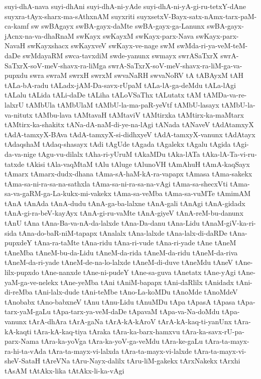 {suyi-dhA-nava
suyi-dhAni
suyi-dhA-ni-yAde
suyi-dhA-ni-yA-gi-ru-tetxY-dAne
suyxra-tAyx-sharx-ma-sAthxnAM
suyxriti
suyxsetxV-Bayx-satx-nAmx-tarx-paM-ca-kamf
sw
swBAgayx
swBA-gayx-daMte
swBA-gayx-ga-Lanunx
swBA-gayx-jAcnx-na-va-dhaRnaM
swKayx
swKayxM
swKayx-parx-Nava
swKayx-parx-NavaH
swKayxshacx
swKayxveV
swKayx-ve-nage
swM
swMda-ri-ya-veM-teM-daDe
swMdayaRM
swca-tavxdiM
swde-yanunx
swmayx
swrASaTxrX
swrA-SaTxrX-soV-meV-shavx-ra-liMga
swrA-SaTxrX-soV-meV-shavx-ra-liM-ga-va-pupxdu
swra
swraM
swrxH
swrxM
swvaNaRH
swvaNoRV
tA
tABAyxM
tAH
tALa-bA-radu
tALadx-jAM-Da-savx-rUpaM
tALa-lA-ga-deMdu
tALa-lAgi
tALalu
tALida
tALi-daDe
tALiha
tALoVSaThx
tALutatx
tAM
tAMDa-va-re-lalxrU
tAMbUla
tAMbUlaM
tAMbU-la-ma-paR-yeVtf
tAMbU-lasayx
tAMbU-la-va-nitutx
tAMbu-lava
tAMtavaH
tAMtaviV
tAMtirxka
tAMtirx-ka-maMtarx
tAMtirx-ka-shakitx
tANa-dA-naM-di-ye-na-lAgi
tANada
tANaveV
tAdAtamxyX
tAdA-tamxyX-BAva
tAdA-tamxyX-si-didhxyeV
tAdA-tamxyX-vanunx
tAdAtayx
tAdaqshaM
tAdaq-shasayx
tAdi
tAgUde
tAgada
tAgalekx
tAgalu
tAgida
tAgi-da-va-nige
tAgu-vu-dilalx
tAha-ri-yUruM
tAkaMDu
tAka-lATa
tAka-lA-Ta-vi-ru-tatxde
tAkisi
tAla-vaqMtaM
tAlu
tAluge
tAlunoVH
tAmAhuH
tAmA-kaqSayx
tAmarx
tAmarx-dudx-dhana
tAma-sA-haM-kA-ra-vapapx
tAmasa
tAma-sakekx
tAma-sa-ni-ra-sa-na-sathxla
tAma-sa-ni-ra-sa-na-vAgi
tAma-sa-shecxVti
tAma-sa-va-gaRM-ga-La-kukx-mi-vakekx
tAma-sa-veMba
tAma-sa-vuMTe
tAmimAM
tAnA
tAnAda
tAnA-dudu
tAnA-ga-ba-lalxne
tAnA-gali
tAnAgi
tAnA-gidadx
tAnA-gi-ra-beV-kayAyx
tAnA-gi-ru-vaMte
tAnA-giyeV
tAnA-reM-bu-danunx
tAnU
tAna
tAna-Ba-va-nA-da-lalxde
tAna-Da-danu
tAna-Lidu
tAnaM-giV-ka-ri-sida
tAna-do-baR-niM-tapapx
tAnalalx
tAna-lalxde
tAna-lalx-di-daRDe
tAna-pupxdeY
tAna-ra-taMte
tAna-ridu
tAna-ri-vude
tAna-ri-yade
tAne
tAneM
tAneMba
tAneM-bu-da-Lidu
tAneM-da-rida
tAneM-da-ridu
tAneM-da-riva
tAneM-da-ri-yade
tAneM-de-na-lo-lalxde
tAneM-di-duve
tAneMdu
tAneV
tAne-lilx-pupxdo
tAne-nanxde
tAne-ni-pudeY
tAne-sa-guva
tAnetatx
tAne-yAgi
tAne-yaM-ga-ve-nelekx
tAne-yeMba
tAni
tAniM-bapapx
tAni-daRlilx
tAnidadx
tAni-di-reMba
tAni-lalx-dude
tAni-teMbe
tAno-La-koMDu
tAnoMde
tAnoMdeV
tAnobabx
tAno-babxneV
tAnu
tAnu-Lidu
tAnuMDu
tApa
tApasA
tApasa
tApa-tarx-yaM-gaLu
tApa-tarx-ya-veM-daDe
tApavaM
tApa-va-Na-doMdu
tApa-vanunx
tArA-dhAra
tArA-gaNa
tArA-kA-kAroV
tArA-kA-kaq-ti-yanUnx
tAra-kA-kaqti
tAra-kA-kaq-tiya
tAraka
tAra-ka-barx-hamxvu
tAra-ka-savx-rU-pa-parx-Nama
tAra-ka-yoVga
tAra-ka-yoV-ga-veMdu
tAra-ke-gaLu
tAra-ta-mayx-ra-hi-ta-vAda
tAra-ta-mayx-vi-lalxda
tAra-ta-mayx-vi-lalxde
tAra-ta-mayx-vi-sheV-SataH
tAreVNa
tAru-Nayx-dalilx
tAru-liM-gakekx
tArxNakekx
tArxhi
tAsAM
tAtAkx-lika
tAtAkx-li-ka-vAgi
}
